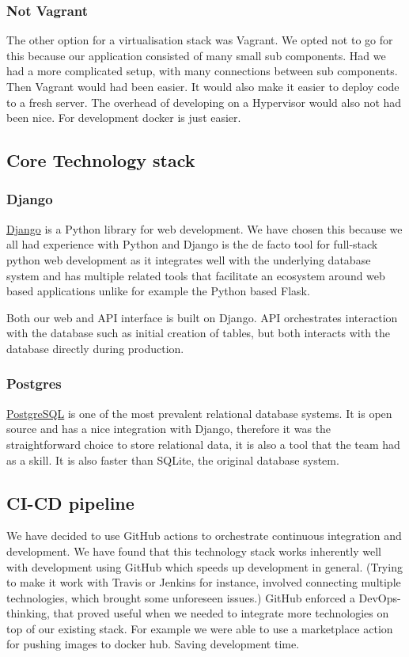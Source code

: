 \documentclass[12pt]{article}
\begin{document}
\subsubsection{Not Vagrant}
The other option for a virtualisation stack was Vagrant. We opted not to go for this because our application consisted of many small sub components. Had we had a more complicated setup, with many connections between sub components. Then Vagrant would had been easier. It would also make it easier to deploy code to a fresh server. The overhead of developing on a Hypervisor would also not had been nice. For development docker is just easier. 
\subsection{Core Technology stack}

\subsubsection{Django}
\href{https://www.Djangoproject.com/}{Django} is a Python library for web development. We have chosen this because we all had experience with Python and Django is the de facto tool for full-stack python web development as it integrates well with the underlying database system and has multiple related tools that facilitate an ecosystem around web based applications unlike for example the Python based Flask. 

Both our web and API interface is built on Django. API orchestrates interaction with the database such as initial creation of tables, but both interacts with the database directly during production.

\subsubsection{Postgres}
\href{https://www.postgresql.org/}{PostgreSQL} is one of the most prevalent relational database systems. It is open source and has a nice integration with Django, therefore it was the straightforward choice to store relational data, it is also a tool that the team had as a skill. It is also faster than SQLite, the original database system.


\subsection{CI-CD pipeline}
We have decided to use GitHub actions to orchestrate continuous integration and development. We have found that this technology stack works inherently well with development using GitHub which speeds up development in general. (Trying to make it work with Travis or Jenkins for instance, involved connecting multiple technologies, which brought some unforeseen issues.) GitHub enforced a DevOps-thinking, that proved useful when we needed to integrate more technologies on top of our existing stack. For example we were able to use a marketplace action for pushing images to docker hub. Saving development time.
\end{document}
